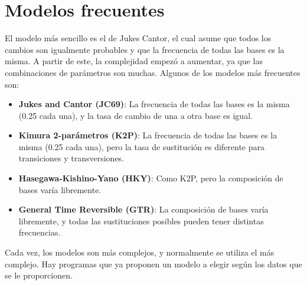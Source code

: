 \section{Modelos frecuentes}
El modelo más sencillo es el de Jukes Cantor, el cual asume que todos los cambios son igualmente probables y que la frecuencia de todas las bases es la misma. A partir de este, la complejidad empezó a aumentar, ya que las combinaciones de parámetros son muchas. Algunos de los modelos más frecuentes son: \begin{itemize}
\item \textbf{Jukes and Cantor (JC69)}: La frecuencia de todas las bases es la misma (0.25 cada una), y la tasa de cambio de una a otra base es igual.
\item \textbf{Kimura 2-parámetros (K2P)}: La frecuencia de todas las bases es la misma (0.25 cada una), pero la tasa de sustitución es diferente para transiciones y transversiones.
\item \textbf{Hasegawa-Kishino-Yano (HKY)}: Como K2P, pero la composición de bases varía libremente.
\item \textbf{General Time Reversible (GTR)}: La composición de bases varía libremente, y todas las sustituciones posibles pueden tener distintas frecuencias.
\end{itemize}

Cada vez, los modelos son más complejos, y normalmente se utiliza el más complejo. Hay programas que ya proponen un modelo a elegir según los datos que se le proporcionen. 